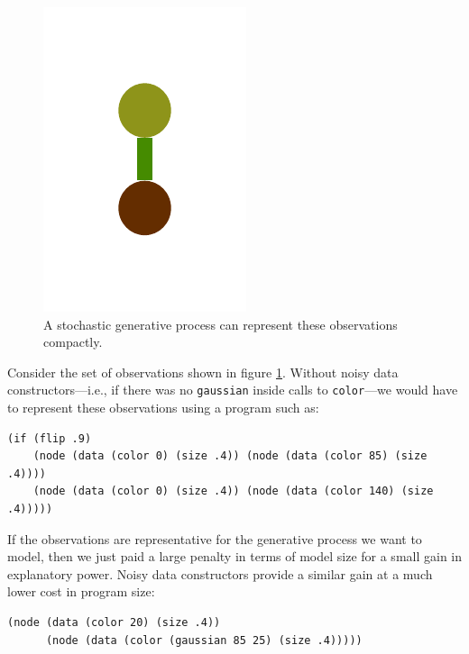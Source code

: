 \documentclass[a4paper,10pt]{article}
\begin{document}
\begin{figure}[t]
\includegraphics[scale=.26]{../figures/vector/4-2-4-noisy-constructor-example-b-0.pdf}
\caption{A stochastic generative process can represent these observations compactly.}
\label{fig:noiseCons}
\end{figure}

Consider the set of observations shown in figure \ref{fig:noiseCons}. Without noisy data constructors---i.e., if there was no \texttt{gaussian} inside calls to \texttt{color}---we would have to represent these observations using a program such as:
\begin{lstlisting}
(if (flip .9)
    (node (data (color 0) (size .4)) (node (data (color 85) (size .4))))
    (node (data (color 0) (size .4)) (node (data (color 140) (size .4)))))
\end{lstlisting}
If the observations are representative for the generative process we want to model, then we just paid a large penalty in terms of model size for a small gain in explanatory power. Noisy data constructors provide a similar gain at a much lower cost in program size:
\begin{lstlisting}
(node (data (color 20) (size .4))
      (node (data (color (gaussian 85 25) (size .4)))))
\end{lstlisting}
\end{document}
